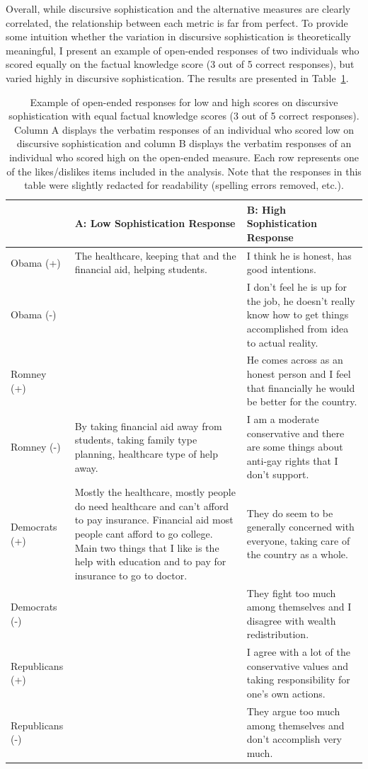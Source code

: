 \documentclass[12pt]{article}
\begin{document}
Overall, while discursive sophistication and the alternative measures are clearly correlated, the relationship between each metric is far from perfect. To provide some intuition whether the variation in discursive sophistication is theoretically meaningful, I present an example of open-ended responses of two individuals who scored equally on the factual knowledge score (3 out of 5 correct responses), but varied highly in discursive sophistication. The results are presented in Table~\ref{tab:ex1}.

\begin{table}[ht]\footnotesize\centering
\begin{tabular}{l|p{6.5cm}|p{6.5cm}}
   \toprule
  & A: Low Sophistication Response & B: High Sophistication Response \\ 
   \midrule
   Obama (+) & The healthcare, keeping that and the financial aid, helping students. & I think he is honest, has good intentions. \\ \hdashline
     Obama (-) &  & I don't feel he is up for the job, he doesn't really know how to get things accomplished from idea to actual reality. \\ \hdashline
     Romney (+) &  & He comes across as an honest person and I feel that financially he would be better for the country. \\ \hdashline
     Romney (-) & By taking financial aid away from students, taking family type planning, healthcare type of help away. & I am a moderate conservative and there are some things about anti-gay rights that I don't support. \\ \hdashline
     Democrats (+) & Mostly the healthcare, mostly people do need healthcare and can't afford to pay insurance. Financial aid most people cant afford to go college. Main two things that I like is the help with education and to pay for insurance to go to doctor. & They do seem to be generally concerned with everyone, taking care of the country as a whole. \\ \hdashline
     Democrats (-) &  & They fight too much among themselves and I disagree with wealth redistribution. \\ \hdashline
     Republicans (+) &  & I agree with a lot of the conservative values and taking responsibility for one's own actions. \\ \hdashline
     Republicans (-) &  & They argue too much among themselves and don't accomplish very much. \\ 
    \bottomrule
 \end{tabular}
\caption{Example of open-ended responses for low and high scores on discursive sophistication with equal factual knowledge scores (3 out of 5 correct responses). Column A displays the verbatim responses of an individual who scored low on discursive sophistication and column B displays the verbatim responses of an individual who scored high on the open-ended measure. Each row represents one of the likes/dislikes items included in the analysis. Note that the responses in this table were slightly redacted for readability (spelling errors removed, etc.).}\label{tab:ex1}
\end{table}
\end{document}
